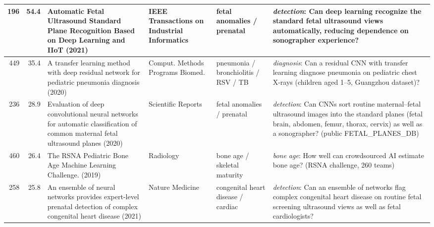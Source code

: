 \documentclass[aspectratio=169]{beamer}
\begin{document}
\begin{frame}
\begin{adjustbox}{max totalsize={\textwidth}{0.74\textheight}}
\begin{tabular}{|r|r|>{\raggedright\arraybackslash}p{}|>{\raggedright\arraybackslash}p{}|>{\raggedright\arraybackslash}p{}|>{\raggedright\arraybackslash}p{}|}
196 & 54.4 & Automatic Fetal Ultrasound Standard Plane Recognition Based on Deep Learning and IIoT (2021) & IEEE Transactions on Industrial Informatics & fetal anomalies / prenatal & \textit{detection}: Can deep learning recognize the standard fetal ultrasound views automatically, reducing dependence on sonographer experience? \\ \hline
449 & 35.4 & A transfer learning method with deep residual network for pediatric pneumonia diagnosis (2020) & Comput. Methods Programs Biomed. & pneumonia / bronchiolitis / RSV / TB & \textit{diagnosis}: Can a residual CNN with transfer learning diagnose pneumonia on pediatric chest X-rays (children aged 1--5, Guangzhou dataset)? \\ \hline
236 & 28.9 & Evaluation of deep convolutional neural networks for automatic classification of common maternal fetal ultrasound planes (2020) & Scientific Reports & fetal anomalies / prenatal & \textit{detection}: Can CNNs sort routine maternal--fetal ultrasound images into the standard planes (fetal brain, abdomen, femur, thorax, cervix) as well as a sonographer? (public FETAL\_PLANES\_DB) \\ \hline
460 & 26.4 & The RSNA Pediatric Bone Age Machine Learning Challenge. (2019) & Radiology & bone age / skeletal maturity & \textit{bone age}: How well can crowdsourced AI estimate bone age? (RSNA challenge, 260 teams) \\ \hline
258 & 25.8 & An ensemble of neural networks provides expert-level prenatal detection of complex congenital heart disease (2021) & Nature Medicine & congenital heart disease / cardiac & \textit{detection}: Can an ensemble of networks flag complex congenital heart disease on routine fetal screening ultrasound views as well as fetal cardiologists? \\ \hline
\end{tabular}
\end{adjustbox}
\\[2pt]
\end{frame}
\end{document}
